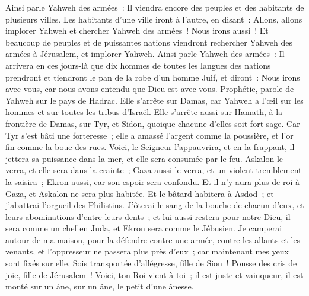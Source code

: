 \begin{multicols}{2}
Ainsi parle Yahweh des armées~: Il viendra encore des peuples et des habitants de plusieurs villes.
Les habitants d'une ville iront à l'autre, en disant~: Allons, allons implorer Yahweh et chercher Yahweh des armées~! Nous irons aussi~!
Et beaucoup de peuples et de puissantes nations viendront rechercher Yahweh des armées à Jérusalem, et implorer Yahweh.
Ainsi parle Yahweh des armées~: Il arrivera en ces jours-là que dix hommes de toutes les langues des nations prendront et tiendront le pan de la robe d'un homme Juif, et diront~: Nous irons avec vous, car nous avons entendu que Dieu est avec vous.
\VerseOne{}Prophétie, parole de Yahweh sur le pays de Hadrac. Elle s'arrête sur Damas, car Yahweh a l'œil sur les hommes et sur toutes les tribus d'Israël.
Elle s'arrête aussi sur Hamath, à la frontière de Damas, sur Tyr, et Sidon, quoique chacune d'elles soit fort sage.
Car Tyr s'est bâti une forteresse~; elle a amassé l'argent comme la poussière, et l'or fin comme la boue des rues.
Voici, le Seigneur l'appauvrira, et en la frappant, il jettera sa puissance dans la mer, et elle sera consumée par le feu.
Askalon le verra, et elle sera dans la crainte~; Gaza aussi le verra, et un violent tremblement la saisira~; Ekron aussi, car son espoir sera confondu. Et il n'y aura plus de roi à Gaza, et Askalon ne sera plus habitée.
Et le bâtard habitera à Asdod~; et j'abattrai l'orgueil des Philistins.
J'ôterai le sang de la bouche de chacun d'eux, et leurs abominations d'entre leurs dents~; et lui aussi restera pour notre Dieu, il sera comme un chef en Juda, et Ekron sera comme le Jébusien.
Je camperai autour de ma maison, pour la défendre contre une armée, contre les allants et les venants, et l'oppresseur ne passera plus près d'eux~; car maintenant mes yeux sont fixés sur elle.
Sois transportée d'allégresse, fille de Sion~! Pousse des cris de joie, fille de Jérusalem~! Voici, ton Roi vient à toi~; il est juste et vainqueur, il est monté sur un âne, sur un âne, le petit d'une ânesse.

\end{multicols}

